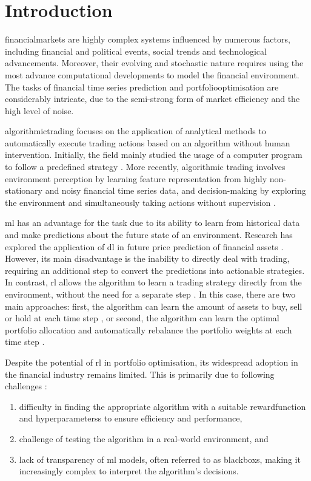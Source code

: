 \chapter{Introduction} \label{ch:introduction}

\Gls{financialmarkets} are highly complex systems influenced by numerous factors, including financial and political events, social trends and technological advancements. Moreover, their evolving and stochastic nature requires using the most advance computational developments to model the financial environment. The tasks of financial time series prediction and \gls{portfoliooptimisation} are considerably intricate, due to the semi-strong form of market efficiency and the high level of noise. \cite{Shen2020}

\Gls{algorithmictrading} focuses on the application of analytical methods to automatically execute trading actions based on an algorithm without human intervention. Initially, the field mainly studied the usage of a computer program to follow a predefined strategy \cite{Lei2020}. More recently, algorithmic trading involves environment perception by learning feature representation from highly non-stationary and noisy financial time series data, and decision-making by exploring the environment and simultaneously taking actions without supervision \cite{Ma2021}.

\acrfull{ml} has an advantage for the task due to its ability to learn from historical data and make predictions about the future state of an environment. Research has explored the application of \acrfull{dl} in future price prediction of financial assets \cite{Hasan2024,Nti2020,Shen2020,Wu2023}. However, its main disadvantage is the inability to directly deal with trading, requiring an additional step to convert the predictions into actionable strategies. In contrast, \acrfull{rl} allows the algorithm to learn a trading strategy directly from the environment, without the need for a separate step \cite{Moody2001,Yang2020}. In this case, there are two main approaches: first, the algorithm can learn the amount of assets to buy, sell or hold at each time step \cite{Liu2018}, or second, the algorithm can learn the optimal portfolio allocation and automatically rebalance the portfolio weights at each time step \cite{Guan2021}.

Despite the potential of \acrshort{rl} in portfolio optimisation, its widespread adoption in the financial industry remains limited. This is primarily due to following challenges \cite{Cortes2024}:
\begin{enumerate}
    \item difficulty in finding the appropriate algorithm with a suitable \gls{rewardfunction} and \glspl{hyperparameters} to ensure efficiency and performance,
    \item challenge of testing the algorithm in a real-world environment, and
    \item lack of transparency of \acrshort{ml} models, often referred to as \glspl{blackbox}, making it increasingly complex to interpret the algorithm's decisions. 
\end{enumerate}

